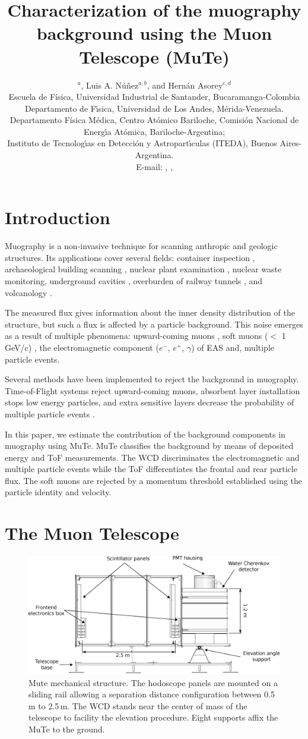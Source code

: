 \documentclass{PoS}
\title{Characterization of the muography background using the Muon Telescope (MuTe)}
\author{\speaker{Jes\'us Pe\~na-Rodr\'iguez}$^{a}$, Luis A. N\'u\~nez$^{a,b}$, and Hern\'an Asorey$^{c,d}$\\
        \llap{$^{a}$} Escuela de F\'isica, Universidad Industrial de Santander, Bucaramanga-Colombia\\
        \llap{$^{b}$} Departamento de F\'{\i}sica, Universidad de Los Andes, M\'erida-Venezuela.\\
        \llap{$^{c}$} Departamento F\'isica M\'edica, Centro At\'omico Bariloche, Comisi\'on Nacional de Energ\'{\i}a At\'omica, Bariloche-Argentina; \\
        \llap{$^{d}$} Instituto de Tecnolog\'{\i}as en Detecci\'on y Astropart\'{\i}culas (ITEDA), Buenos Aires-Argentina.\\
        E-mail: \email{jesus.pena@correo.uis.edu.co},
        \email{lnunez@uis.edu.co}, \email{asoreyh@cab.cnea.gov.ar}
        }
\begin{document}
\section{Introduction}
Muography is a non-invasive technique for scanning anthropic and geologic structures. Its applications cover several fields: container inspection \cite{Blanpied2015}, archaeological building scanning \cite{Morishima2017, GomezEtal2016}, nuclear plant examination \cite{Fujii2013}, nuclear waste monitoring, underground cavities \cite{Saracino2017}, overburden of railway tunnels \cite{ThompsonEtal2019}, and volcanology \cite{TanakaOlah2019}.

The measured flux gives information about the inner density distribution of the structure, but such a flux is affected by a particle background. This noise emerges as a result of multiple phenomena: upward-coming muons \cite{Marteau2014, Cimmino2017}, soft muons ($<$ 1\,GeV/c) \cite{Nishiyama2014B,Gomez2017}, the electromagnetic component ($e^-$, $e^+$, $\gamma$) of EAS \cite{Lesparre2012} and, multiple particle events.

Several methods have been implemented to reject the background in muography. Time-of-Flight systems reject upward-coming muons, absorbent layer installation stops low energy particles, and extra sensitive layers decrease the probability of multiple particle events \cite{Lesparre2012}.

In this paper, we estimate the contribution of the background components in muography using MuTe. MuTe classifies the background by means of deposited energy and ToF measurements. The WCD discriminates the electromagnetic and multiple particle events while the ToF differentiates the frontal and rear particle flux. The soft muons are rejected by a momentum threshold established using the particle identity and velocity. 


\section{The Muon Telescope}

\begin{figure}[!h]
\begin{center}
\includegraphics[width=.8\textwidth]{Figures/Detector.eps}
\caption{Mute mechanical structure. The hodoscope panels are mounted on a sliding rail allowing a separation distance configuration between 0.5\,m to 2.5\,m. The WCD stands near the center of mass of the telescope to facility the elevation procedure. Eight supports affix the MuTe to the ground. }
\label{detector}
\end{center}
\end{figure}
\end{document}
